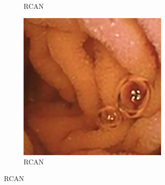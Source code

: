 \begin{figure}[H]
\begin{subfigure}[b]{0.275\textwidth}
    \caption{RCAN}
  \end{subfigure}
  \begin{subfigure}[b]{0.275\textwidth}
    \includegraphics[width=\textwidth]{Chapter7/rcan_456.jpg}
    \caption{RCAN}
  \end{subfigure}
  

\end{figure}

